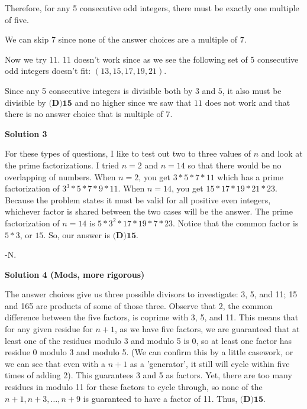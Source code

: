 \begin{enumerate}
 Therefore, for any 5 consecutive odd integers, there must be exactly one multiple of five.

 We can skip 7 since none of the answer choices are a multiple of 7.

 Now we try $11.$ 11 doesn't work since as we see the following set of 5 consecutive odd integers doesn't fit: $(13, 15, 17, 19, 21).$

 Since any 5 consecutive integers is divisible both by $3$ and $5$, it also must be divisible by ${\boxed{\textbf{(D)15}}}$ and no higher since we saw that $11$ does not work and that there is no answer choice that is multiple of $7$.

 


 



\textbf{Solution 3}

For these types of questions, I like to test out two to three values of $n$ and look at the prime factorizations. I tried $n = 2$ and $n = 14$ so that there would be no overlapping of numbers. When $n = 2$, you get $3 * 5 * 7 * 11$ which has a prime factorization of $3^3 * 5 * 7 * 9 * 11$. When $n = 14$, you get $15 * 17 * 19 * 21 * 23$. Because the problem states it must be valid for all positive even integers, whichever factor is shared between the two cases will be the answer. The prime factorization of $n = 14$ is $5 * 3^2 * 17 * 19 * 7 * 23$. Notice that the common factor is $5*3$, or $15$. So, our answer is ${\boxed{\textbf{(D)15}}}$.

 -N.

 



\textbf{Solution 4 (Mods, more rigorous)}

The answer choices give us three possible divisors to investigate: 3, 5, and 11; 15 and 165 are products of some of those three. Observe that 2, the common difference between the five factors, is coprime with 3, 5, and 11. This means that for any given residue for $n+1$, as we have five factors, we are guaranteed that at least one of the residues modulo 3 and modulo 5 is 0, so at least one factor has residue 0 modulo 3 and modulo 5. (We can confirm this by a little casework, or we can see that even with a $n+1$ as a 'generator', it still will cycle within five times of adding 2). This guarantees 3 and 5 as factors. Yet, there are too many residues in modulo 11 for these factors to cycle through, so none of the $n+1,n+3,\dots,n+9$ is guaranteed to have a factor of 11. Thus, ${\boxed{\textbf{(D)15}}}$.


\end{enumerate}
